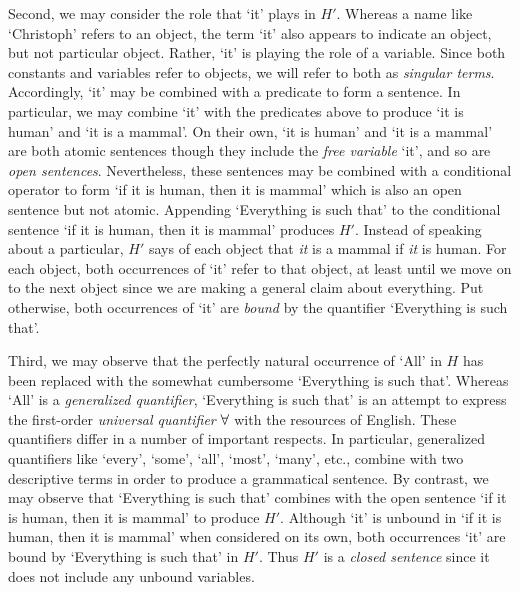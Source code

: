 Second, we may consider the role that `it' plays in $H'$.
Whereas a name like `Christoph' refers to an object, the term `it' also appears to indicate an object, but not particular object.
Rather, `it' is playing the role of a variable.
Since both constants and variables refer to objects, we will refer to both as \textit{singular terms}.
Accordingly, `it' may be combined with a predicate to form a sentence.
In particular, we may combine `it' with the predicates above to produce `it is human' and `it is a mammal'.
On their own, `it is human' and `it is a mammal' are both atomic sentences though they include the \textit{free variable} `it', and so are \textit{open sentences}.
Nevertheless, these sentences may be combined with a conditional operator to form `if it is human, then it is mammal' which is also an open sentence but not atomic.
Appending `Everything is such that' to the conditional sentence `if it is human, then it is mammal' produces $H'$. %
Instead of speaking about a particular, $H'$ says of each object that \textit{it} is a mammal if \textit{it} is human.
For each object, both occurrences of `it' refer to that object, at least until we move on to the next object since we are making a general claim about everything.
Put otherwise, both occurrences of `it' are \textit{bound} by the quantifier `Everything is such that'.

Third, we may observe that the perfectly natural occurrence of `All' in $H$ has been replaced with the somewhat cumbersome `Everything is such that'.
Whereas `All' is a \textit{generalized quantifier}, `Everything is such that' is an attempt to express the first-order \textit{universal quantifier} $\forall$ with the resources of English.
These quantifiers differ in a number of important respects.
In particular, generalized quantifiers like `every', `some', `all', `most', `many', etc., combine with two descriptive terms in order to produce a grammatical sentence.
By contrast, we may observe that `Everything is such that' combines with the open sentence `if it is human, then it is mammal' to produce $H'$.
Although `it' is unbound in `if it is human, then it is mammal' when considered on its own, both occurrences `it' are bound by `Everything is such that' in $H'$.
Thus $H'$ is a \textit{closed sentence} since it does not include any unbound variables.

